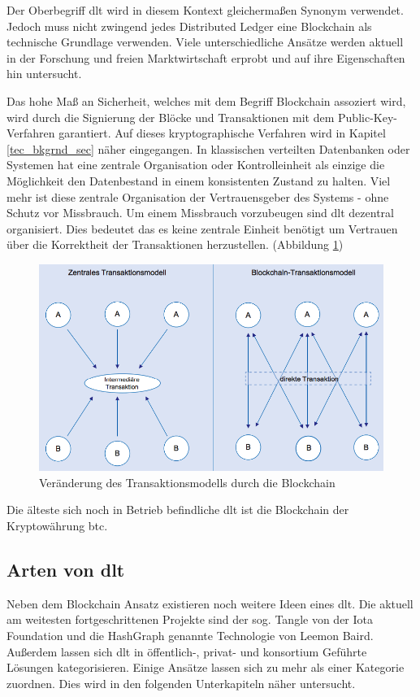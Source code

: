 Der Oberbegriff \acf{dlt} wird in diesem Kontext gleichermaßen Synonym verwendet. Jedoch muss nicht zwingend jedes \glqq Distributed Ledger\grqq{} eine Blockchain als technische Grundlage verwenden. Viele unterschiedliche Ansätze werden aktuell in der Forschung und freien Marktwirtschaft erprobt und auf ihre Eigenschaften hin untersucht.

Das hohe Maß an Sicherheit, welches mit dem Begriff Blockchain assoziert wird, wird durch die Signierung der Blöcke und Transaktionen mit dem Public-Key-Verfahren garantiert. Auf dieses kryptographische Verfahren wird in Kapitel \ref{tec_bkgrnd_sec} näher eingegangen. In klassischen verteilten Datenbanken oder Systemen hat eine zentrale Organisation oder Kontrolleinheit als einzige die Möglichkeit den Datenbestand in einem konsistenten Zustand zu halten. Viel mehr ist diese zentrale Organisation der Vertrauensgeber des Systems - ohne Schutz vor Missbrauch. Um einem Missbrauch vorzubeugen sind \ac{dlt} dezentral organisiert. Dies bedeutet das es keine zentrale Einheit benötigt um Vertrauen über die Korrektheit der Transaktionen herzustellen.\cite[Vgl.]{Mitschele2018} (Abbildung \ref{fig:change-in-transaction-model-blockchain})
\begin{figure}[h!]
	\centering
	\includegraphics[width=0.81\linewidth]{pictures/change-in-transaction-model-blockchain}
	\caption[Veränderung des Transaktionsmodells durch die Blockchain]{Veränderung des Transaktionsmodells durch die Blockchain\cite{Kastrati2016}}
	\label{fig:change-in-transaction-model-blockchain}
\end{figure}

Die älteste sich noch in Betrieb befindliche \ac{dlt} ist die Blockchain der Kryptowährung \ac{btc}.

\subsection{Arten von \acl{dlt}}
Neben dem Blockchain Ansatz existieren noch weitere Ideen eines \ac{dlt}. Die aktuell am weitesten fortgeschrittenen Projekte sind der sog. \glqq Tangle\grqq{} von der Iota Foundation und die \glqq HashGraph\grqq{} genannte Technologie von Leemon Baird.\cite{Baird2016} Außerdem lassen sich \ac{dlt} in öffentlich-, privat- und konsortium Geführte Lösungen kategorisieren. Einige Ansätze lassen sich zu mehr als einer Kategorie zuordnen. Dies wird in den folgenden Unterkapiteln näher untersucht.

